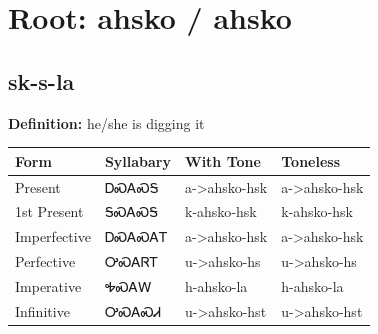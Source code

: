 \documentclass{article}%
\begin{document}
%
\normalsize%
\section*{Root: ahsko / ahsko}%
\subsection*{sk-s-la}%
\textbf{Definition: }%
he/she is digging it%
\\[0.5em]%
\begin{tabular}{|l|l|l|l|}%
\hline%
\textbf{Form}&\textbf{Syllabary}&\textbf{With Tone}&\textbf{Toneless}\\%
\hline%
Present&ᎠᏍᎪᏍᎦ&a{-}>ahsko{-}hsk&a{-}>ahsko{-}hsk\\%
1st Present&ᎦᏍᎪᏍᎦ&k{-}ahsko{-}hsk&k{-}ahsko{-}hsk\\%
Imperfective&ᎠᏍᎪᏍᎪᎢ&a{-}>ahsko{-}hsk&a{-}>ahsko{-}hsk\\%
Perfective&ᎤᏍᎪᏒᎢ&u{-}>ahsko{-}hs&u{-}>ahsko{-}hs\\%
Imperative&ᎭᏍᎪᎳ&h{-}ahsko{-}la&h{-}ahsko{-}la\\%
Infinitive&ᎤᏍᎪᏍᏗ&u{-}>ahsko{-}hst&u{-}>ahsko{-}hst\\%
\hline%
\end{tabular}%
\\[1em]%
\end{document}
